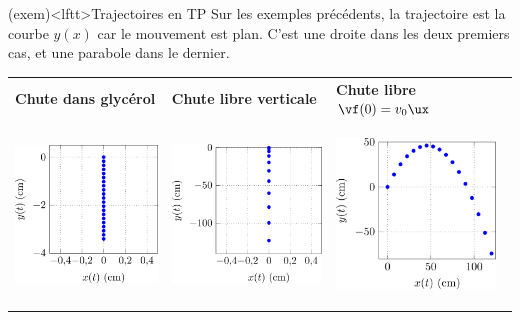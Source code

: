 \documentclass[../../main/main.tex]{subfiles}
\begin{document}
\begin{tcb}(exem)<lftt>{Trajectoires en TP}
	Sur les exemples précédents, la trajectoire est la courbe $y(x)$ car le
	mouvement est plan. C'est une droite dans les deux premiers cas, et une parabole
	dans le dernier.
	\begin{center}
		\begin{tabularx}{\linewidth}{Y|Y|Y}
			\textbf{Chute dans glycérol}
			 &
			\textbf{Chute libre verticale}
			 &
			\textbf{Chute libre $\vf(0) = v_0\ux$}
			\\
			\begin{center}
				\includegraphics[height=4cm]{traj_glyc}
				\vspace*{-25pt}
			\end{center}
			 &
			\begin{center}
				\includegraphics[height=4cm]{traj_nov}
				\vspace*{-25pt}
			\end{center}
			 &
			\begin{center}
				\includegraphics[height=4cm]{traj_vo}
				\vspace*{-25pt}
			\end{center}
		\end{tabularx}
	\end{center}
\end{tcb}
\end{document}
